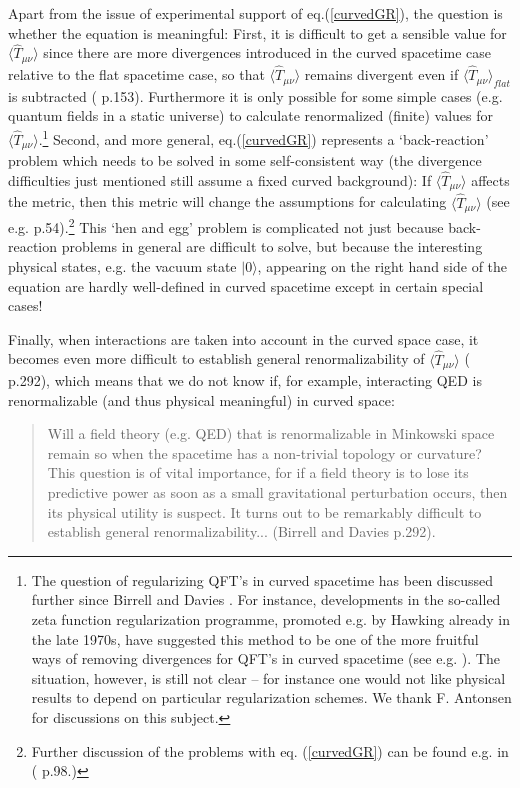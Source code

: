 \documentclass[12pt]{article}
\begin{document}
Apart from the issue of experimental support of
eq.(\ref{curvedGR}), the question is whether the equation is
meaningful: First, it is difficult to get a sensible value for
$\langle \hat{T}_{\mu \nu} \rangle $ since there are more divergences introduced
in the curved spacetime case relative to the flat spacetime case,
so that $\langle \hat{T}_{\mu \nu} \rangle $ remains divergent even if
$\langle \hat{T}_{\mu \nu} \rangle _{flat}$ is subtracted (\cite{birrell82}
p.153). Furthermore it is only possible for some simple cases
(e.g. quantum fields in a static universe) to calculate
renormalized (finite) values for $\langle\hat{T}_{\mu
\nu}\rangle$.\footnote{The question of regularizing QFT's in curved
spacetime has been discussed further since Birrell and Davies
\cite{birrell82}. For instance, developments in the so-called zeta
function regularization programme, promoted e.g. by Hawking
already in the late 1970s, have suggested this method to be one of
the more fruitful ways of removing divergences for QFT's in curved
spacetime (see e.g. \cite{elizalde95}). The situation, however, is
still not clear -- for instance one would not like physical
results to depend on particular regularization schemes. We thank
F. Antonsen for discussions on this subject.} Second, and more
general, eq.(\ref{curvedGR}) represents a `back-reaction' problem
which needs to be solved in some self-consistent way (the
divergence difficulties just mentioned still assume a fixed curved
background): If $\langle \hat{T}_{\mu \nu} \rangle $ affects the metric, then
this metric will change the assumptions for calculating
$\langle \hat{T}_{\mu \nu} \rangle $ (see e.g. \cite{wald94}
p.54).\footnote{Further discussion of the problems with eq.
(\ref{curvedGR}) can be found e.g. in (\cite{wald94} p.98.)} This
`hen and egg' problem is complicated not just because
back-reaction problems in general are difficult to
solve, but because the 
interesting physical states, e.g. the vacuum state $|0 \rangle $, 
appearing on the right hand side of the equation are hardly 
well-defined in curved spacetime except in certain special cases!


Finally, when interactions are taken into account in the curved
space case, it becomes even more difficult to establish general
renormalizability of $\langle \hat{T}_{\mu \nu} \rangle $ (\cite{birrell82}
p.292), which means that we do not know if, for example,
interacting QED is renormalizable (and thus physical meaningful)
in curved space:

\begin{quote}
Will a field theory (e.g. QED) that is renormalizable in 
Minkowski space remain so when the spacetime has a non-trivial
topology or curvature? This question is of vital importance,
for if a field theory is to lose its predictive power as soon
as a small gravitational perturbation occurs, then its physical
utility is suspect. It turns out to be remarkably difficult
to establish general renormalizability... (Birrell and Davies 
\cite{birrell82} p.292).
\end{quote}
\end{document}

